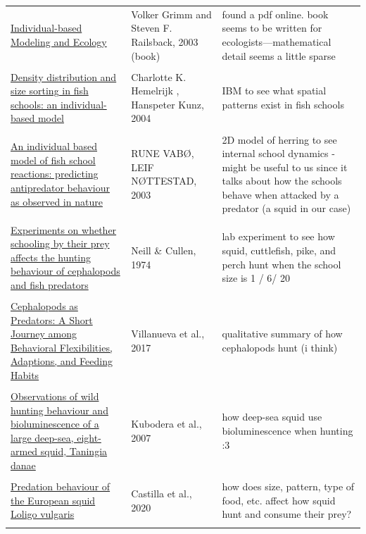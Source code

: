\documentclass[12pt]{article}
\begin{document}
\begin{longtable}{p{2.0in}|p{1.0in}|p{2.5in}}
        \href{https://www.degruyterbrill.com/document/doi/10.1515/9781400850624/html}{Individual-based Modeling and Ecology} & Volker Grimm and Steven F. Railsback, 2003 (book) & found a pdf online. book seems to be written for ecologists---mathematical detail seems a little sparse\\ \\ 
        \href{https://academic.oup.com/beheco/article/16/1/178/206370}{Density distribution and size sorting in fish schools: an individual-based model} & Charlotte K. Hemelrijk , Hanspeter Kunz, 2004 & IBM to see what spatial patterns exist in fish schools \\ \\ 

        \href{https://onlinelibrary.wiley.com/doi/abs/10.1046/j.1365-2419.1997.00037.x}{
An individual based model of fish school reactions: predicting antipredator behaviour as observed in nature} &RUNE VABØ, LEIF NØTTESTAD, 2003 & 2D model of herring to see internal school dynamics - might be useful to us since it talks about how the schools behave when attacked by a predator (a squid in our case) \\ \\

        \href{https://zslpublications.onlinelibrary.wiley.com/doi/abs/10.1111/j.1469-7998.1974.tb04385.x}{Experiments on whether schooling by their prey affects the hunting behaviour of cephalopods and fish predators} & Neill \& Cullen, 1974 & lab experiment to see how squid, cuttlefish, pike, and perch hunt when the school size is 1 / 6/ 20 \\ \\

        \href{https://www.frontiersin.org/journals/physiology/articles/10.3389/fphys.2017.00598/full}{Cephalopods as Predators: A Short Journey among Behavioral Flexibilities, Adaptions, and Feeding Habits} & Villanueva et al., 2017 & qualitative summary of how cephalopods hunt (i think) \\ \\

        \href{https://pmc.ncbi.nlm.nih.gov/articles/PMC2124471/}{Observations of wild hunting behaviour and bioluminescence of a large deep-sea, eight-armed squid, Taningia danae} & Kubodera et al., 2007 & how deep-sea squid use bioluminescence when hunting :3 \\ \\

        \href{https://link.springer.com/article/10.1007/s10164-020-00652-4}{Predation behaviour of the European squid Loligo vulgaris} & Castilla et al., 2020 & how does size, pattern, type of food, etc. affect how squid hunt and consume their prey? \\ \\


\end{longtable}
\end{document}
